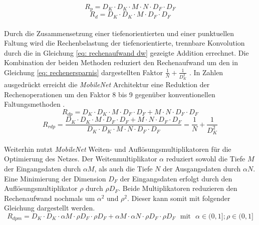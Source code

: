 		\begin{equation}
			R_p=D_K \cdot D_K \cdot M \cdot N \cdot D_F \cdot D_F
			\label{eq: rechenaufwand}
		\end{equation}
		\begin{equation}
		R_d=D_K \cdot D_K \cdot M \cdot D_F \cdot D_F
		\label{eq: rechenaufwand t}
		\end{equation}\\
	
		Durch die Zusammensetzung einer tiefenorientierten und einer punktuellen Faltung wird die Rechenbelastung der tiefenorientierte, trennbare Konvolution durch die in Gleichung \ref{eq: rechenaufwand dw} gezeigte Addition errechnet. Die Kombination der beiden Methoden reduziert den Rechenaufwand um den in Gleichung \ref{eq: rechenersparnis} dargestellten Faktor $\frac{1}{N}+\frac{1}{D^2_K}$ \cite{mobilenets}. In Zahlen ausgedrückt erreicht die \textit{MobileNet} Architektur eine Reduktion der Rechenoperationen um den Faktor 8 bis 9 gegenüber konventionellen Faltungsmethoden \cite{mobilenets}.  \\
	
		\begin{equation}
			R_{dp}=D_K \cdot D_K \cdot M \cdot D_F \cdot D_F + M \cdot N \cdot D_F \cdot D_F
			\label{eq: rechenaufwand dw}
		\end{equation}
		\begin{equation}
			R_{rdp}=\frac{D_K \cdot D_K \cdot M \cdot D_F \cdot D_F + M \cdot N \cdot D_F \cdot D_F}{D_K \cdot D_K \cdot M \cdot N \cdot D_F \cdot D_F}=\frac{1}{N}+\frac{1}{D^2_K}
			\label{eq: rechenersparnis}
		\end{equation}\\
		
		
		Weiterhin nutzt \textit{MobileNet} Weiten- und Auflösungsmultiplikatoren für die Optimierung des Netzes. Der Weitenmultiplikator $\alpha$ reduziert sowohl die Tiefe $M$ der Eingangsdaten durch $\alpha M$, als auch die Tiefe $N$ der Ausgangsdaten durch $\alpha N$. Eine Minimierung der Dimension $D_F$ der Eingangsdaten erfolgt durch den Auflösungsmultiplikator $\rho$ durch $\rho D_F$. Beide Multiplikatoren reduzieren den Rechenaufwand nochmals um $\alpha^2$ und $\rho^2$. Dieser kann somit mit folgender Gleichung dargestellt werden. \\
		
		\begin{equation}
			R_{dpm}=D_K \cdot D_K \cdot \alpha M \cdot \rho D_F \cdot \rho D_F + \alpha M \cdot \alpha N \cdot \rho D_F \cdot \rho D_F \text{  }\text{mit}\text{  } \alpha \in (0,1] ; \rho \in (0,1]
			\label{eq: rechenaufwand dw}
		\end{equation}\\
	
